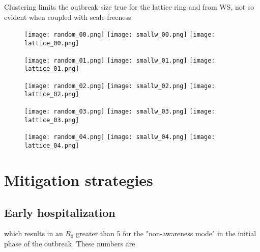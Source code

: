 \documentclass[DIV=12, BCOR=0pt]{scrartcl}  %
\begin{document}
  
  Clustering limits the outbreak size \citep{PastorSatorras}
  true for the lattice ring and from WS, not so evident when coupled with scale-freeness
  

  
  \clearpage
  \begin{figure}[h!]
		\centering
	 	\texttt{[image: random\_00.png]}
	 	\texttt{[image: smallw\_00.png]}
	 	\texttt{[image: lattice\_00.png]}

	 	\texttt{[image: random\_01.png]}
	 	\texttt{[image: smallw\_01.png]}
	 	\texttt{[image: lattice\_01.png]}
	 	\caption{ }
		\label{fig:networks0}
	\end{figure}  	
  
  \begin{figure}[h!]
		\centering
	 	\texttt{[image: random\_02.png]}
	 	\texttt{[image: smallw\_02.png]}
	 	\texttt{[image: lattice\_02.png]}
		
	 	\texttt{[image: random\_03.png]}
	 	\texttt{[image: smallw\_03.png]}
	 	\texttt{[image: lattice\_03.png]}
	  	
	 	\texttt{[image: random\_04.png]}
	 	\texttt{[image: smallw\_04.png]}
	 	\texttt{[image: lattice\_04.png]}
	 		
  	\caption{ }
  	\label{fig:outcomes0}
  \end{figure}
  
  \clearpage
  
  
  
  \section{Mitigation strategies} %
  \label{sec:immuni}
  
  
   
   \subsection{Early hospitalization}
   which results in an $R_0$ greater than 5 for the "non-awareness mode" in the initial phase of the outbreak. These numbers are
   \citep{Firth2020}
   
\end{document}
